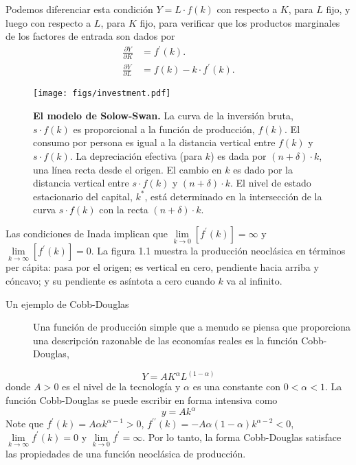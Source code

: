 Podemos diferenciar esta condición $Y=L\cdot f\left(k\right)$ con respecto a $K$, para $L$ fijo, y luego con respecto a $L$, para $K$ fijo, para verificar que los productos marginales de los factores de entrada son dados por
\begin{align}
\frac{\partial Y}{\partial K}&=f^{\prime}\left(k\right).\\
\frac{\partial Y}{\partial L}&=f\left(k\right)-k\cdot f^{\prime}\left(k\right).
\end{align}
\begin{figure}
	\centering
	\texttt{[image: figs/investment.pdf]}
	\caption{\textbf{El modelo de Solow-Swan.} La curva de la inversión bruta, $s\cdot f\left(k\right)$ es proporcional a la función de producción, $f\left(k\right)$. El consumo por persona es igual a la distancia vertical entre $f\left(k\right)$ y $s\cdot f\left(k\right)$. La depreciación efectiva (para $k$) es dada por $\left(n+\delta\right)\cdot k$, una línea recta desde el origen. El cambio en $k$ es dado por la distancia vertical entre $s\cdot f\left(k\right)$ y $\left(n+\delta\right)\cdot k$. El nivel de estado estacionario del capital, $k^{\ast}$, está determinado en la intersección de la curva $s\cdot f\left(k\right)$ con la recta $\left(n+\delta\right)\cdot k$.}
\end{figure}

Las condiciones de Inada implican que $\lim\limits_{k\to0}\left[f^{\prime}\left(k\right)\right]=\infty$ y $\lim\limits_{k\to\infty}\left[f^{\prime}\left(k\right)\right]=0$. La figura 1.1 muestra la producción neoclásica en términos per cápita: pasa por el origen; es vertical en cero, pendiente hacia arriba y cóncavo; y su pendiente es asíntota a cero cuando $k$ va al infinito.
\begin{description}
\item[Un ejemplo de Cobb-Douglas] Una función de producción simple que a menudo se piensa que proporciona una descripción razonable de las economías reales es la función Cobb-Douglas,
\end{description}
\begin{equation}
Y=AK^{\alpha}L^{\left(1-\alpha\right)}
\end{equation}
donde $A>0$ es el nivel de la tecnología y $\alpha$ es una constante con $0<\alpha<1$. La función Cobb-Douglas se puede escribir en forma intensiva como
\begin{equation}
y=Ak^{\alpha}
\end{equation}
Note que $f^{\prime}\left(k\right)=A\alpha k^{\alpha-1}>0$, $f^{\prime\prime}\left(k\right)=-A\alpha\left(1-\alpha\right)k^{\alpha-2}<0$, $\lim\limits_{k\to\infty}f^{\prime}\left(k\right)=0$ y $\lim\limits_{k\to0}f^{\prime}=\infty$. Por lo tanto, la forma Cobb-Douglas satisface las propiedades de una función neoclásica de producción.


